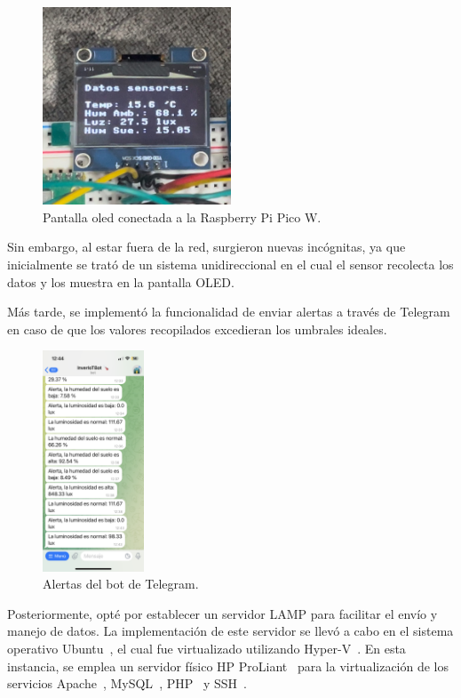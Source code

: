 \begin{figure}[h]
	\centering
	\includegraphics[width=0.5\textwidth]{img/fotos/oled1.png}
	\caption{Pantalla oled conectada a la Raspberry Pi Pico W.} \label{Img:oled_conexion}
\end{figure}

Sin embargo, al estar fuera de la red, surgieron nuevas incógnitas, ya que inicialmente se trató de un sistema unidireccional en el cual el sensor recolecta los datos y los muestra en la pantalla OLED.

Más tarde, se implementó la funcionalidad de enviar alertas a través de Telegram en caso de que los valores recopilados excedieran los umbrales ideales.

\begin{figure}[h]
	\centering
	\includegraphics[width=0.27\textwidth]{img/desarrollo/BotTelegram_alertas.png}
	\caption{Alertas del bot de Telegram.} \label{Img:BotTelegram_alertas}
\end{figure}

Posteriormente, opté por establecer un servidor LAMP para facilitar el envío y manejo de datos. La implementación de este servidor se llevó a cabo en el sistema operativo Ubuntu~\cite{misc:Ubuntu}, el cual fue virtualizado utilizando Hyper-V~\cite{manual:Hyper_V}.
En esta instancia, se emplea un servidor físico HP ProLiant~\cite{misc:HP_ProLiant} para la virtualización de los servicios Apache~\cite{misc:Apache}, MySQL~\cite{misc:Mysql}, PHP~\cite{misc:PHP} y SSH~\cite{misc:SSH}.

